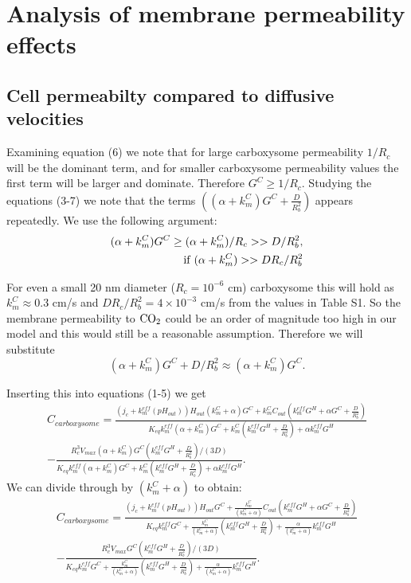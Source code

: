 \documentclass[]{article}
\begin{document}
\section{Analysis of membrane permeability effects}
\subsection{Cell permeabilty compared to diffusive velocities}
Examining equation (6) we note that for large carboxysome permeability $1/R_c$ will be the dominant term, and for smaller carboxysome permeability values the first term will be larger and dominate. Therefore $G^C \geq 1/R_c$. Studying the equations (3-7) we note that the terms $((\alpha + k_m^C)G^C+\frac{D}{R_b^2})$ appears repeatedly. We use the following argument:
\begin{eqnarray}
(\alpha + k_m^C)G^C \geq (\alpha + k_m^C)/R_c>>D/R_b^2, \\
\; {\rm if} \; (\alpha +k_m^C)>> D R_c/R_b^2
\end{eqnarray}

For even a small 20 nm diameter ($R_c = 10^{-6}$ cm) carboxysome this will hold as $k_m^C \approx 0.3 $ cm/s and $D R_c/R_b^2 = 4 \times 10^{-3}$ cm/s from the values in Table S1. So the membrane permeability to ${\rm CO_2}$ could be an order of magnitude too high in our model and this would still be a reasonable assumption. Therefore we will substitute 
\begin{equation}
(\alpha + k_m^C)G^C + D/R_b^2 \approx (\alpha + k_m^C)G^C.
\end{equation}

Inserting this into equations (1-5) we get
\begin{multline}
C_{carboxysome} = \frac{(j_c+k_m^{eff}(pH_{out}))H_{out}(k_m^C+\alpha)G^C 
	+ k_m^C C_{out} (k_m^{eff} G^H +\alpha G^C+\frac{D}{R_b^2})}
{K_{eq} k_m^{eff}(\alpha+ k_m^C)G^C 
	 + k_m^C\left(k_m^{eff} G^H + \frac{D}{R_b^2}\right) + \alpha k_m^{eff} G^H} \\
-\frac{R_c^3 V_{max}(\alpha + k_m^C)G^C(k_m^{eff} G^H + \frac{D}{R_b^2})/(3D)}
{ K_{eq} k_m^{eff} \left(\alpha+ k_m^C \right)G^C 
	+ k_m^C\left(k_m^{eff} G^H + \frac{D}{R_b^2}\right) + \alpha k_m^{eff} G^H}.
\end{multline}
We can divide through by  $(k_m^C+\alpha)$ to obtain:
\begin{multline}
	C_{carboxysome} = \frac{(j_c+k_m^{eff}(pH_{out}))H_{out}G^C + \frac{k_m^C}{(k_m^C+\alpha)} C_{out} (k_m^{eff} G^H +\alpha G^C+\frac{D}{R_b^2})}
	{K_{eq} k_m^{eff} G^C  
		+\frac{k_m^C}{(k_m^C+\alpha)} \left(k_m^{eff} G^H + \frac{D}{R_b^2}\right) 
		+ \frac{\alpha}{(k_m^C+\alpha)}  k_m^{eff} G^H} \\
	-\frac{R_c^3 V_{max}G^C(k_m^{eff} G^H + \frac{D}{R_b^2})/(3D)}
	{ K_{eq} k_m^{eff} G^C + \frac{k_m^C}{(k_m^C+\alpha)}\left(k_m^{eff} G^H + \frac{D}{R_b^2}\right) 
		+ \frac{\alpha}{(k_m^C+\alpha)} k_m^{eff} G^H}.
\end{multline}
\end{document}

